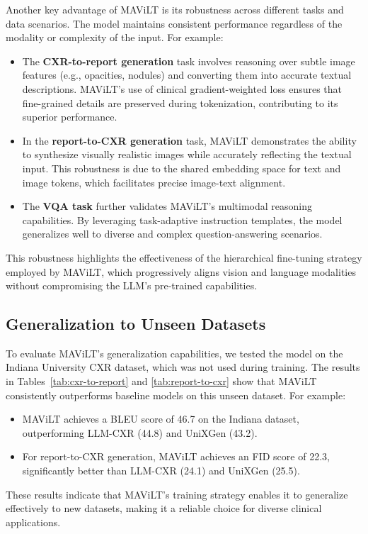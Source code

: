 Another key advantage of MAViLT is its robustness across different tasks and data scenarios. The model maintains consistent performance regardless of the modality or complexity of the input. For example:
\begin{itemize}
    \item The \textbf{CXR-to-report generation} task involves reasoning over subtle image features (e.g., opacities, nodules) and converting them into accurate textual descriptions. MAViLT’s use of clinical gradient-weighted loss ensures that fine-grained details are preserved during tokenization, contributing to its superior performance.
    \item In the \textbf{report-to-CXR generation} task, MAViLT demonstrates the ability to synthesize visually realistic images while accurately reflecting the textual input. This robustness is due to the shared embedding space for text and image tokens, which facilitates precise image-text alignment.
    \item The \textbf{VQA task} further validates MAViLT’s multimodal reasoning capabilities. By leveraging task-adaptive instruction templates, the model generalizes well to diverse and complex question-answering scenarios.
\end{itemize}
This robustness highlights the effectiveness of the hierarchical fine-tuning strategy employed by MAViLT, which progressively aligns vision and language modalities without compromising the LLM’s pre-trained capabilities.

\subsection{Generalization to Unseen Datasets}

To evaluate MAViLT’s generalization capabilities, we tested the model on the Indiana University CXR dataset, which was not used during training. The results in Tables~\ref{tab:cxr-to-report} and \ref{tab:report-to-cxr} show that MAViLT consistently outperforms baseline models on this unseen dataset. For example:
\begin{itemize}
    \item MAViLT achieves a BLEU score of 46.7 on the Indiana dataset, outperforming LLM-CXR (44.8) and UniXGen (43.2).
    \item For report-to-CXR generation, MAViLT achieves an FID score of 22.3, significantly better than LLM-CXR (24.1) and UniXGen (25.5).
\end{itemize}
These results indicate that MAViLT’s training strategy enables it to generalize effectively to new datasets, making it a reliable choice for diverse clinical applications.

